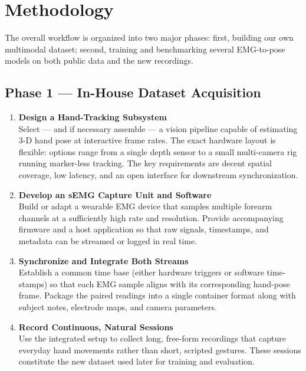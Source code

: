\chapter{Methodology}
\label{chap:met}

The overall workflow is organized into two major phases: first, building our own multimodal dataset; second, training and benchmarking several EMG-to-pose models on both public data and the new recordings.

\section{Phase 1 — In-House Dataset Acquisition}

\begin{enumerate}[label=\textbf{1.\arabic*.}, wide=0pt, leftmargin=*]
    \item \textbf{Design a Hand-Tracking Subsystem}\\
          Select — and if necessary assemble — a vision pipeline capable of estimating 3-D hand pose at interactive frame rates.  The exact hardware layout is flexible: options range from a single depth sensor to a small multi-camera rig running marker-less tracking.  The key requirements are decent spatial coverage, low latency, and an open interface for downstream synchronization.
    \item \textbf{Develop an sEMG Capture Unit and Software}\\
          Build or adapt a wearable EMG device that samples multiple forearm channels at a sufficiently high rate and resolution.  Provide accompanying firmware and a host application so that raw signals, timestamps, and metadata can be streamed or logged in real time.
    \item \textbf{Synchronize and Integrate Both Streams}\\
          Establish a common time base (either hardware triggers or software time-stamps) so that each EMG sample aligns with its corresponding hand-pose frame.  Package the paired readings into a single container format along with subject notes, electrode maps, and camera parameters.
    \item \textbf{Record Continuous, Natural Sessions}\\
          Use the integrated setup to collect long, free-form recordings that capture everyday hand movements rather than short, scripted gestures.  These sessions constitute the new dataset used later for training and evaluation.
\end{enumerate}

